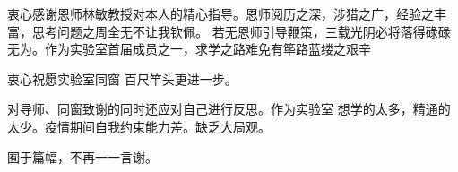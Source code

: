 \begin{acknowledgement}
    衷心感谢恩师林敏教授对本人的精心指导。恩师阅历之深，涉猎之广，经验之丰富，思考问题之周全无不让我钦佩。
    若无恩师引导鞭策，三载光阴必将落得碌碌无为。作为实验室首届成员之一，求学之路难免有筚路蓝缕之艰辛

    衷心祝愿实验室同窗 百尺竿头更进一步。

    对导师、同窗致谢的同时还应对自己进行反思。作为实验室 想学的太多，精通的太少。疫情期间自我约束能力差。缺乏大局观。

    囿于篇幅，不再一一言谢。
\end{acknowledgement}
